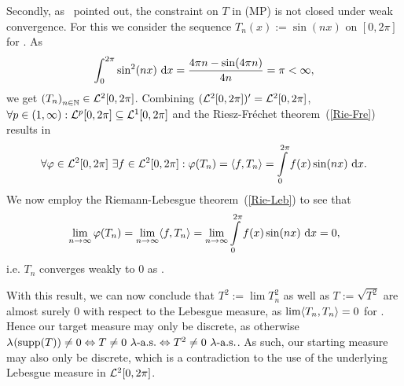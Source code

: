 Secondly, as~\cite{San2015} pointed out, the constraint on $T$ in (MP) is not closed under weak convergence. For this we consider the sequence $T_n(x) := \sin(nx)$ on $[0, 2 \pi]$ for \NinN. As
\[ \int_0^{2 \pi} \sin^2(nx)~\D[x] = \frac{4 \pi n - \sin(4\pi n)}{4n} = \pi < \infty, \]
we get ${(T_n)}_{\NinN} \in \ELL{2}[0, 2 \pi]$. Combining $(\ELL{2}[0, 2 \pi])' = \ELL{2}[0, 2 \pi]$, $\forall p \in (1, \infty) : \ELL{p}[0, 2\pi] \subseteq \ELL{1}[0, 2\pi]$ and the Riesz-Fr\'{e}chet theorem~(\ref{Rie-Fre}) results in
\[ \forall \varphi \in \ELL{2}[0, 2\pi]~\exists f \in \ELL{2}[0, 2\pi]: \varphi(T_n) = \inner{f}{T_n} = \int\limits_0^{2\pi} f(x) \sin(nx)~\D[x]. \]
We now employ the Riemann-Lebesgue theorem~(\ref{Rie-Leb}) to see that
\[ \lim\limits_{\Ninf} \varphi(T_n) = \lim\limits_{\Ninf} \inner{f}{T_n} = \lim\limits_{\Ninf} \int\limits_0^{2\pi} f(x) \sin(nx)~\D[x] = 0, \]
i.e. $T_n$ converges weakly to $0$ as \Ninf.

With this result, we can now conclude that $T^2 := \lim T_n^2$ as well as $T := \sqrt{T^2}$ are almost surely $0$ with respect to the Lebesgue measure, as $\lim \inner{T_n}{T_n} = 0$ for \Ninf. Hence our target measure may only be discrete, as otherwise $\leb{\supp{T}} \neq 0 \Leftrightarrow T \neq 0~\lambda\text{-a.s.} \Leftrightarrow T^2 \neq 0~\lambda\text{-a.s.}$. As such, our starting measure may also only be discrete, which is a contradiction to the use of the underlying Lebesgue measure in $\ELL{2}[0, 2\pi]$.




